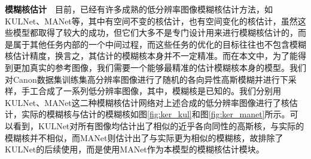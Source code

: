 \noindent\textbf{模糊核估计}\ \ 目前，已经有许多成熟的低分辨率图像模糊核估计方法，如KULNet、MANet等，其中有空间不变的核估计，也有空间变化的核估计，虽然这些模型都取得了较大的成功，但它们大多不是专门设计用来进行模糊核估计的，而是属于其他任务内部的一个中间过程，而这些任务的优化的目标往往也不包含模糊核估计精度，换言之，其估计的模糊核本身并不一定精准。而在本文中，为了能得到更加真实的参考图像，我们需要一个能够最精准的估计模糊核本身的模型。我们对Canon数据集训练集高分辨率图像进行了随机的各向异性高斯模糊并进行下采样，手工合成了一系列低分辨率图像，其中，模糊核是已知的。我们分别用KULNet、MANet这二种模糊核估计网络对上述合成的低分辨率图像进行了核估计，实际的模糊核与估计的模糊核如图\ref{fig:ker_kul}和图\ref{fig:ker_manet}所示。可以看到，KULNet对所有图像均估计出了相似的近乎各向同性的高斯核，与实际的模糊核并不相似，而MANet则估计出了与实际更为相似的模糊核，故排除了KULNet的后续使用，而是使用MANet作为本模型的模糊核估计模块。

